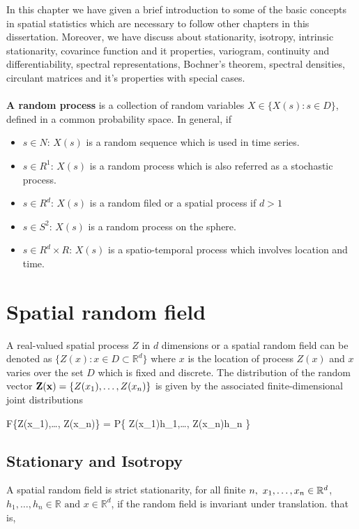 
In this chapter we have given a brief introduction to some of the basic concepts in spatial statistics which are necessary to follow other chapters in this dissertation. Moreover, we have discuss about stationarity, isotropy, intrinsic stationarity, covarince function and it properties, variogram, continuity and differentiability, spectral representations, Bochner's theorem, spectral densities, circulant matrices and it's properties with special cases.\\~\\


{\bf A random process} is a collection of random variables $X \in \{X(s): s\in D\}$, defined in a common probability space. In general, if
\begin{itemize}
	\item $s \in N$: $X(s)$ is a random sequence which is used in time series.
	\item $s \in R^1$: $X(s)$ is a random process which is also referred as a stochastic process.
	\item $s \in R^d$: $X(s)$ is a random filed or a spatial process if $d > 1$
	\item $s \in S^2$: $X(s)$ is a random process on the sphere.
	\item $s \in R^d\times R$: $X(s)$ is a spatio-temporal process which involves location and time.
\end{itemize}

\section{Spatial random field} 

A real-valued spatial process $Z$ in $d$ dimensions or a spatial random field can be denoted as $\{Z(x): x \in D \subset \mathbb{R}^d\}$ where $x$ is the location of process $Z(x)$ and $x$ varies over the set $D$ which is fixed and discrete. The distribution of the random vector ${\bf Z(x)}=\{Z(x_1),\ldots, Z(x_n)\}$ is given by the associated finite-dimensional joint distributions

\beq
F\{Z(x_1),\ldots, Z(x_n)\} = P\{ Z(x_1)\le h_1,\ldots, Z(x_n)\le h_n \} 
\eeq


\subsection{Stationary and Isotropy}
A spatial random field is strict stationarity, for all finite $n,\ x_1,\ldots, x_n \in \mathbb{R}^d$, $h_1, \ldots, h_n\in\mathbb{R} \mbox{ and } x\in \mathbb{R}^d$, if the random field is invariant under translation. that is,

